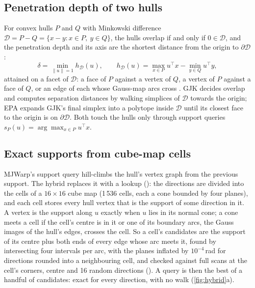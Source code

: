 \subsection{Penetration depth of two hulls}\label{sec:depth}

For convex hulls $P$ and $Q$ with Minkowski difference $\mathcal D = P - Q = \{x - y : x \in P,\ y \in Q\}$, the hulls overlap if and only if $0 \in \mathcal D$, and the penetration depth and its axis are the shortest distance from the origin to $\partial\mathcal D$:
\begin{equation}\label{eq:depth}
\delta = \min_{\lVert u\rVert = 1} h_{\mathcal D}(u), \qquad h_{\mathcal D}(u) = \max_{x\in P} u^\top x - \min_{y\in Q} u^\top y ,
\end{equation}
attained on a facet of $\mathcal D$: a face of $P$ against a vertex of $Q$, a vertex of $P$ against a face of $Q$, or an edge of each whose Gauss-map arcs cross \cite{gregorius}. GJK \cite{gjk} decides overlap and computes separation distances by walking simplices of $\mathcal D$ towards the origin; EPA \cite{epa} expands GJK's final simplex into a polytope inside $\mathcal D$ until its closest face to the origin is on $\partial\mathcal D$. Both touch the hulls only through support queries $s_P(u) = \arg\max_{x\in P} u^\top x$.

\subsection{Exact supports from cube-map cells}\label{sec:cells}

MJWarp's support query hill-climbs the hull's vertex graph from the previous support. The hybrid replaces it with a lookup (): the directions are divided into the cells of a $16\times16$ cube map (1\,536 cells, each a cone bounded by four planes), and each cell stores every hull vertex that is the support of some direction in it. A vertex is the support along $u$ exactly when $u$ lies in its normal cone; a cone meets a cell if the cell's centre is in it or one of its boundary arcs, the Gauss images of the hull's edges, crosses the cell. So a cell's candidates are the support of its centre plus both ends of every edge whose arc meets it, found by intersecting four intervals per arc, with the planes inflated by $10^{-4}$\,rad for directions rounded into a neighbouring cell, and checked against full scans at the cell's corners, centre and 16 random directions (). A query is then the best of a handful of candidates: exact for every direction, with no walk (\cref{fig:hybrid}a).

